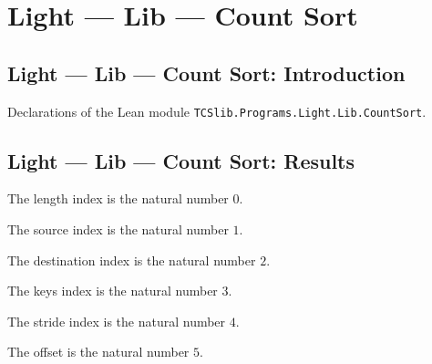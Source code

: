 \section{Light --- Lib --- Count Sort}
\subsection*{Light --- Lib --- Count Sort: Introduction}

Declarations of the Lean module \texttt{TCSlib.Programs.Light.Lib.CountSort}.

\subsection*{Light --- Lib --- Count Sort: Results}

\begin{definition}
\label{Light.CountSort.Len}
\leanok
The length index is the natural number $0$.
\end{definition}

\begin{definition}
\label{Light.CountSort.Src}
\leanok
{}
The source index is the natural number $1$.
\end{definition}

\begin{definition}
\label{Light.CountSort.Dst}
\leanok
{}
The destination index is the natural number $2$.
\end{definition}

\begin{definition}
\label{Light.CountSort.Keys}
\leanok
{}
The keys index is the natural number $3$.
\end{definition}

\begin{definition}
\label{Light.CountSort.Stride}
\leanok
{}
The stride index is the natural number $4$.
\end{definition}

\begin{definition}
\label{Light.CountSort.Offset}
\leanok
{}
The offset is the natural number $5$.
\end{definition}

